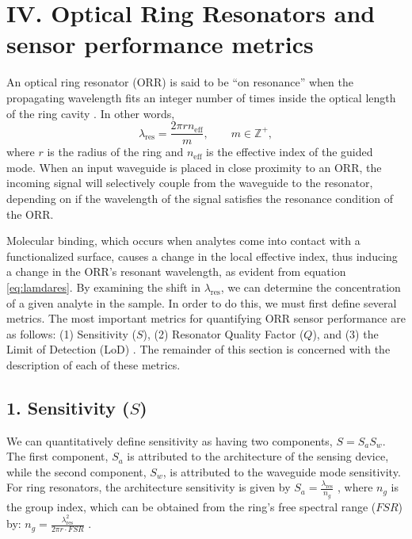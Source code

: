 \documentclass[aps,prl,twocolumn, superscriptaddress,nobalancelastpage]{revtex4}
\begin{document}
\section{IV. Optical Ring Resonators and sensor performance metrics}
\vspace{-1em}

An optical ring resonator (ORR) is said to be ``on resonance'' when the propagating wavelength fits an integer number of times inside the optical length of the ring cavity \cite{sipORRs}. In other words, 
\begin{equation}
    \lambda_\text{res} = \frac{2\pi r n_\text{eff}}{m}, \qquad m \in \mathbb{Z}^+,
    \label{eq:lamdares}
\end{equation}
where $r$ is the radius of the ring and $n_\text{eff}$ is the effective index of the guided mode. When an input waveguide is placed in close proximity to an ORR, the incoming signal will selectively couple from the waveguide to the resonator, depending on if the wavelength of the signal satisfies the resonance condition of the ORR.

Molecular binding, which occurs when analytes come into contact with a functionalized surface, causes a change in the local effective index, thus inducing a change in the ORR's resonant wavelength, as evident from equation \eqref{eq:lamdares}. By examining the shift in $\lambda_\text{res}$, we can determine the concentration of a given analyte in the sample. In order to do this, we must first define several metrics. The most important metrics for quantifying ORR sensor performance are as follows: (1) Sensitivity ($S$), (2) Resonator Quality Factor ($Q$), and (3) the Limit of Detection (LoD) \cite{sipresonators}. The remainder of this section is concerned with the description of each of these metrics.

\vspace{-1em}
\subsection{1. Sensitivity ($S$)}
\vspace{-1em}

We can quantitatively define sensitivity as having two components, $S= S_aS_w$. The first component, $S_a$ is attributed to the architecture of the sensing device, while the second component, $S_w$, is attributed to the waveguide mode sensitivity. For ring resonators, the architecture sensitivity is given by $S_a = \frac{\lambda_\text{res}}{n_g}$ \cite{swg1}, where $n_g$ is the group index, which can be obtained from the ring's free spectral range ($FSR$) by: $n_g = \frac{\lambda_\text{res}^2}{2\pi r \cdot FSR}$ \cite{swg3}.
\end{document}
